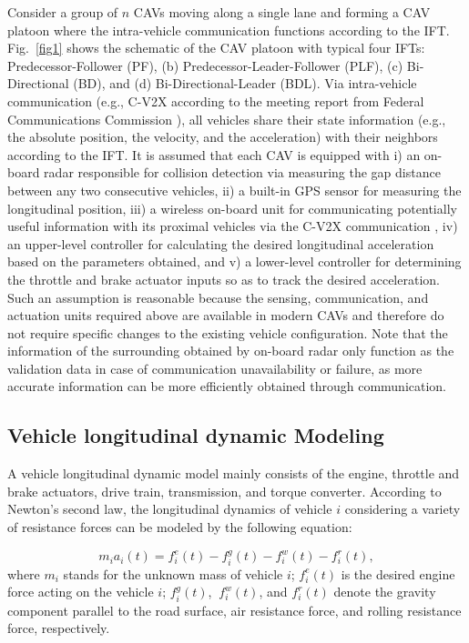 \documentclass[a4paper]{cas-sc}
\begin{document}
Consider a group of $n$ CAVs moving along a single lane and forming a CAV platoon where the intra-vehicle communication functions according to the IFT. Fig.~\ref{fig1} shows the schematic of the CAV platoon with typical four IFTs: Predecessor-Follower (PF), (b) Predecessor-Leader-Follower (PLF), (c) Bi-Directional (BD), and (d) Bi-Directional-Leader (BDL). Via intra-vehicle communication (e.g., C-V2X according to the meeting report from Federal Communications Commission \citep{popeo2020federal}), all vehicles share their state information (e.g., the absolute position, the velocity, and the acceleration) with their neighbors according to the IFT. It is assumed that each CAV is equipped with i) an on-board radar responsible for collision detection via measuring the gap distance between any two consecutive vehicles, ii) a built-in GPS sensor for measuring the longitudinal position, iii) a wireless on-board unit for communicating potentially useful information with its proximal vehicles via the C-V2X communication \citep{VerizonNorth2020}, iv) an upper-level controller for calculating the desired longitudinal acceleration based on the parameters obtained, and v) a lower-level controller for determining the throttle and brake actuator inputs so as to track the desired acceleration. Such an assumption is reasonable because the sensing, communication, and actuation units required above are available in modern CAVs and therefore do not require specific changes to the existing vehicle configuration. Note that the information of the surrounding obtained by on-board radar only function as the validation data in case of communication unavailability or failure, as more accurate information can be more efficiently obtained through communication.

\subsection{Vehicle longitudinal dynamic Modeling}
\label{Section 3.1}

A vehicle longitudinal dynamic model mainly consists of the engine, throttle and brake actuators, drive train, transmission, and torque converter. According to Newton's second law, the longitudinal dynamics of vehicle $i$ considering a variety of resistance forces can be modeled by the following equation:

\begin{equation}
  m_ia_i(t)=f_i^e(t)-f_i^g(t)-f_i^w(t)-f_i^r(t),
  \label{eq1}
\end{equation}
where $m_i$ stands for the unknown mass of vehicle $i$; $f_i^e(t)$ is the desired engine force acting on the vehicle $i$; $f_i^g(t)$, $\ f_i^w(t)$, and $f_i^r(t)$ denote the gravity component parallel to the road surface, air resistance force, and rolling resistance force, respectively.
\end{document}
